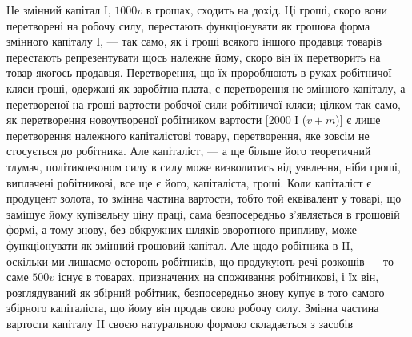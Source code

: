 Не змінний капітал І, $1000v$ в грошах, сходить на дохід. Ці гроші,
скоро вони перетворені на робочу силу, перестають функціонувати як
грошова форма змінного капіталу І, — так само, як і гроші всякого іншого
продавця товарів перестають репрезентувати щось належне йому,
скоро він їх перетворить на товар якогось продавця. Перетворення, що
їх пророблюють в руках робітничої кляси гроші, одержані як заробітна
плата, є перетворення не змінного капіталу, а перетвореної на гроші
вартости робочої сили робітничої кляси; цілком так само, як перетворення
новоутвореної робітником вартости [2000 І ($v + m$)] є лише перетворення
належного капіталістові товару, перетворення, яке зовсім
не стосується до робітника. Але капіталіст, — а ще більше його теоретичний
тлумач, політикоеконом силу в силу може визволитись від уявлення,
ніби гроші, виплачені робітникові, все ще є його, капіталіста, гроші.
Коли капіталіст є продуцент золота, то змінна частина вартости, тобто
той еквівалент у товарі, що заміщує йому купівельну ціну праці, сама
безпосередньо з’являється в грошовій формі, а тому знову, без обкружних
шляхів зворотного припливу, може функціонувати як змінний грошовий
капітал. Але щодо робітника в II, — оскільки ми лишаємо осторонь
робітників, що продукують речі розкошів — то саме $500v$ існує в товарах,
призначених на споживання робітникові, і їх він, розглядуваний як
збірний робітник, безпосередньо знову купує в того самого збірного
капіталіста, що йому він продав свою робочу силу. Змінна частина
вартости капіталу II своєю натуральною формою складається з засобів
\parbreak{}  %
